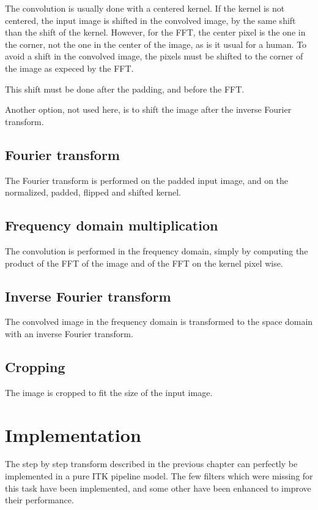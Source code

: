 \documentclass{InsightArticle}
\begin{document}
The convolution is usually done with a centered kernel. If the kernel is not centered, the input image
is shifted in the convolved image, by the same shift than the shift of the kernel. However, for the
FFT, the center pixel is the one in the corner, not the one in the center of the image, as is it 
usual for a human. To avoid a shift in the convolved image, the pixels must be shifted to the corner
of the image as expeced by the FFT.

This shift must be done after the padding, and before the FFT.

Another option, not used here, is to shift the image after the inverse Fourier transform.

\subsection{Fourier transform}

The Fourier transform is performed on the padded input image, and on the normalized, padded, flipped
and shifted kernel.

\subsection{Frequency domain multiplication}

The convolution is performed in the frequency domain, simply by computing the product of the FFT of
the image and of the FFT on the kernel pixel wise.

\subsection{Inverse Fourier transform}

The convolved image in the frequency domain is transformed to the space domain with an inverse Fourier
transform.

\subsection{Cropping}

The image is cropped to fit the size of the input image.


\section{Implementation}

The step by step transform described in the previous chapter can perfectly be implemented in a pure
ITK pipeline model. The few filters which were missing for this task have been implemented, and some
other have been enhanced to improve their performance.
\end{document}
